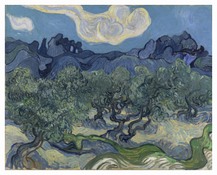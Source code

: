 \begin{frame}
\begin{figure}[H]
\begin{subfigure}[h]{0.32\textwidth}
            \includegraphics[width=\textwidth]{resources/content/style/the_olive_trees.jpg}
        \end{subfigure}
    
    
    

\end{figure}
\end{frame}
